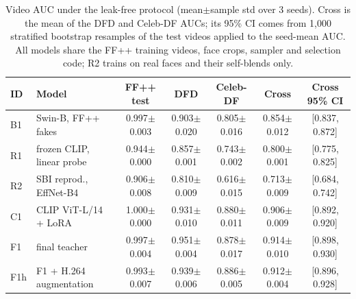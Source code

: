 \begin{table}[t]
\centering
\footnotesize
\caption{Video AUC under the leak-free protocol (mean$\pm$sample std over 3 seeds). Cross is the mean of the DFD and Celeb-DF AUCs; its 95\% CI comes from 1,000 stratified bootstrap resamples of the test videos applied to the seed-mean AUC. All models share the FF++ training videos, face crops, sampler and selection code; R2 trains on real faces and their self-blends only.}
\label{tab:main}
\begin{tabular}{llccccc}
\toprule
ID & Model & FF++ test & DFD & Celeb-DF & Cross & Cross 95\% CI \\
\midrule
B1 & Swin-B, FF++ fakes & 0.997$\pm$0.003 & 0.903$\pm$0.020 & 0.805$\pm$0.016 & 0.854$\pm$0.012 & [0.837, 0.872] \\
R1 & frozen CLIP, linear probe & 0.944$\pm$0.000 & 0.857$\pm$0.001 & 0.743$\pm$0.002 & 0.800$\pm$0.001 & [0.775, 0.825] \\
R2 & SBI reprod., EffNet-B4 & 0.906$\pm$0.008 & 0.810$\pm$0.009 & 0.616$\pm$0.015 & 0.713$\pm$0.009 & [0.684, 0.742] \\
\midrule
C1 & CLIP ViT-L/14 + LoRA & 1.000$\pm$0.000 & 0.931$\pm$0.010 & 0.880$\pm$0.011 & 0.906$\pm$0.009 & [0.892, 0.920] \\
F1 & final teacher & 0.997$\pm$0.004 & 0.951$\pm$0.004 & 0.878$\pm$0.017 & 0.914$\pm$0.010 & [0.898, 0.930] \\
F1h & F1 + H.264 augmentation & 0.993$\pm$0.007 & 0.939$\pm$0.006 & 0.886$\pm$0.005 & 0.912$\pm$0.004 & [0.896, 0.928] \\
\bottomrule
\end{tabular}
\end{table}
